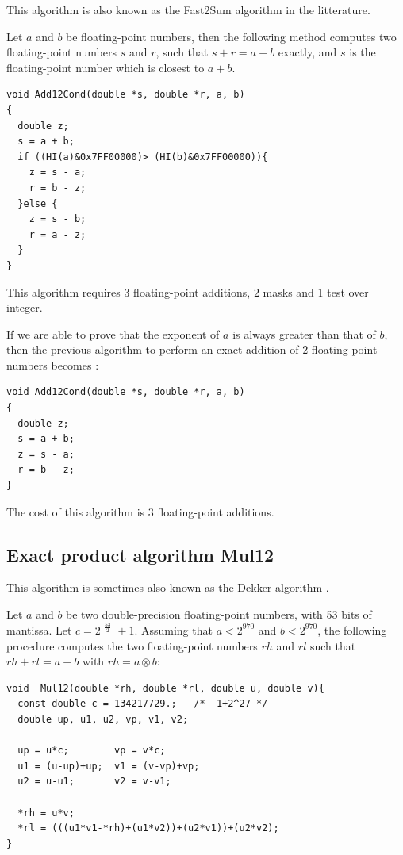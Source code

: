 This algorithm is also known as the Fast2Sum algorithm in the litterature.
\begin{theorem}
  Let $a$ and $b$ be floating-point numbers, then the following method
  computes two floating-point numbers $s$ and $r$, such that $s+r =
  a+b$ exactly, and $s$ is the floating-point number which is closest
  to $a+b$.

\begin{lstlisting}[label={lst:Add12Cond},caption={Add12Cond},firstnumber=1]
void Add12Cond(double *s, double *r, a, b) 
{
  double z;
  s = a + b;            
  if ((HI(a)&0x7FF00000)> (HI(b)&0x7FF00000)){  
    z = s - a;           
    r = b - z;           
  }else {                 
    z = s - b;           
    r = a - z;           
  } 
}                         
\end{lstlisting}
This algorithm requires $3$ floating-point additions, $2$ masks and $1$ test over integer.
\end{theorem}


If we are able to prove that  the exponent of $a$ is always greater than that
of $b$, then the previous algorithm to perform an exact addition of 2
floating-point numbers becomes :
\begin{lstlisting}[label={lst:Add12},caption={Add12},firstnumber=1]
void Add12Cond(double *s, double *r, a, b) 
{
  double z;
  s = a + b;            
  z = s - a;  
  r = b - z; 
}            
\end{lstlisting}
The cost of this algorithm is $3$ floating-point additions.






\subsection{Exact product algorithm {Mul12}}

This algorithm is sometimes  also known as the Dekker algorithm \cite{Dek71,Knu73}.

\begin{theorem}
  Let $a$ and $b$ be two double-precision floating-point numbers, with
  53 bits of mantissa. Let $c=2^{\lceil\frac{ 53}{2} \rceil}+1$.
  Assuming that $a<2^{970}$ and $b<2^{970}$, the following procedure
  computes the two floating-point numbers $rh$ and $rl$ such that $rh
  + rl = a + b$ with $rh = a \otimes b$:
\begin{lstlisting}[label={lst:Mul12},caption={Mul12},firstnumber=1]
void  Mul12(double *rh, double *rl, double u, double v){
  const double c = 134217729.;   /*  1+2^27 */ 
  double up, u1, u2, vp, v1, v2;

  up = u*c;        vp = v*c;
  u1 = (u-up)+up;  v1 = (v-vp)+vp;
  u2 = u-u1;       v2 = v-v1;
  
  *rh = u*v;
  *rl = (((u1*v1-*rh)+(u1*v2))+(u2*v1))+(u2*v2);
}
\end{lstlisting}
\end{theorem}

